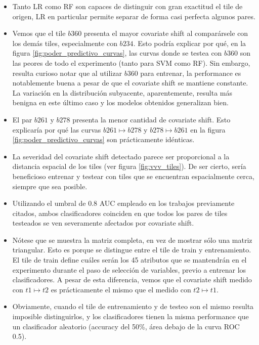 \begin{itemize}
\item Tanto LR como RF son capaces de distinguir con gran exactitud el tile de origen, LR en particular permite separar de forma casi perfecta algunos pares.
\item Vemos que el tile $b360$ presenta el mayor covariate shift al comparársele con los demás tiles, especialmente con $b234$. Esto podría explicar por qué, en la figura \ref{fig:poder_predictivo_curvas}, las curvas donde se testea con $b360$ son las peores de todo el experimento (tanto para SVM como RF). Sin embargo, resulta curioso notar que al utilizar $b360$ para entrenar, la performance es notablemente buena a pesar de que el covariate shift se mantiene constante. La variación en la distribución subyacente, aparentemente, resulta más benigna en este último caso y los modelos obtenidos generalizan bien.
\item El par $b261$ y $b278$ presenta la menor cantidad de covariate shift. Esto explicaría por qué las curvas $b261 \mapsto b278$ y $b278 \mapsto b261$ en la figura \ref{fig:poder_predictivo_curvas} son prácticamente idénticas.
\item La severidad del covariate shift detectado parece ser proporcional a la distancia espacial de los tiles (ver figura \ref{fig:vvv_tiles}). De ser cierto, sería beneficioso entrenar y testear con tiles que se encuentran espacialmente cerca, siempre que sea posible.
\item Utilizando el umbral de 0.8 AUC empleado en los trabajos previamente citados, ambos clasificadores coinciden en que todos los pares de tiles testeados se ven severamente afectados por covariate shift.
\item Nótese que se muestra la matriz completa, en vez de mostrar sólo una matriz triangular. Esto es porque se distingue entre el tile de train y entrenamiento. El tile de train define cuáles serán los 45 atributos que se mantendrán en el experimento durante el paso de selección de variables, previo a entrenar los clasificadores. A pesar de esta diferencia, vemos que el covariate shift medido con $t1 \mapsto t2$ es prácticamente el mismo que el medido con $t2 \mapsto t1$.
\item Obviamente, cuando el tile de entrenamiento y de testeo son el mismo resulta imposible distinguirlos, y los clasificadores tienen la misma performance que un clasificador aleatorio (accuracy del 50\%, área debajo de la curva ROC 0.5).
\end{itemize}

